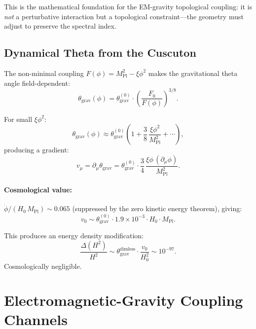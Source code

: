 This is the mathematical foundation for the EM-gravity topological coupling: it is \emph{not} a perturbative interaction but a topological constraint---the geometry must adjust to preserve the spectral index.


\subsection{Dynamical Theta from the Cuscuton}
\label{sec:4-dynamical-theta}

The non-minimal coupling $F(\phi) = M_{\mathrm{Pl}}^2 - \xi\phi^2$ makes the gravitational theta angle field-dependent:
\begin{equation}
  \theta_{\mathrm{grav}}(\phi) = \theta_{\mathrm{grav}}^{(0)} \cdot
  \left(\frac{F_0}{F(\phi)}\right)^{3/8}.
  \label{eq:4-49}
\end{equation}

For small $\xi\phi^2$:
\begin{equation}
  \theta_{\mathrm{grav}}(\phi) \approx \theta_{\mathrm{grav}}^{(0)}
  \left(1 + \frac{3}{8}\, \frac{\xi\phi^2}{M_{\mathrm{Pl}}^2} + \cdots\right),
  \label{eq:4-50}
\end{equation}
producing a gradient:
\begin{equation}
  v_\mu = \partial_\mu \theta_{\mathrm{grav}}
        = \theta_{\mathrm{grav}}^{(0)} \cdot \frac{3}{4}\,
          \frac{\xi\phi\,(\partial_\mu\phi)}{M_{\mathrm{Pl}}^2}.
  \label{eq:4-51}
\end{equation}

\paragraph{Cosmological value:} $\dot{\phi}/(H_0\, M_{\mathrm{Pl}}) \sim 0.065$ (suppressed by the zero kinetic energy theorem), giving:
\begin{equation}
  v_0 \sim \theta_{\mathrm{grav}}^{(0)} \cdot 1.9 \times 10^{-3} \cdot H_0 \cdot M_{\mathrm{Pl}}.
  \label{eq:4-52}
\end{equation}

This produces an energy density modification:
\begin{equation}
  \frac{\Delta(H^2)}{H^2} \sim \theta_{\mathrm{grav}}^{\mathrm{dimless}} \cdot \frac{v_0}{H_0^2}
  \sim 10^{-97}.
  \label{eq:4-53}
\end{equation}
Cosmologically negligible.


\section{Electromagnetic-Gravity Coupling Channels}
\label{sec:4-em-gravity}

